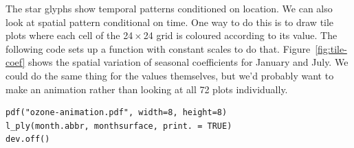 \documentclass{scrartcl}
\newcommand{\x}{\,$\times$\,}
\begin{document}
%


%


The star glyphs show temporal patterns conditioned on location.  We can also look at spatial pattern conditional on time.  One way to do this is to draw tile plots where each cell of the 24\x24 grid is coloured according to its value.  The following code sets up a function with constant scales to do that.  Figure~\ref{fig:tile-coef} shows the spatial variation of seasonal coefficients for January and July.  We could do the same thing for the values themselves, but we'd probably want to make an animation rather than looking at all 72 plots individually.

% 


\begin{verbatim}
pdf("ozone-animation.pdf", width=8, height=8)
l_ply(month.abbr, monthsurface, print. = TRUE)
dev.off()
\end{verbatim}

% 

\end{document}
